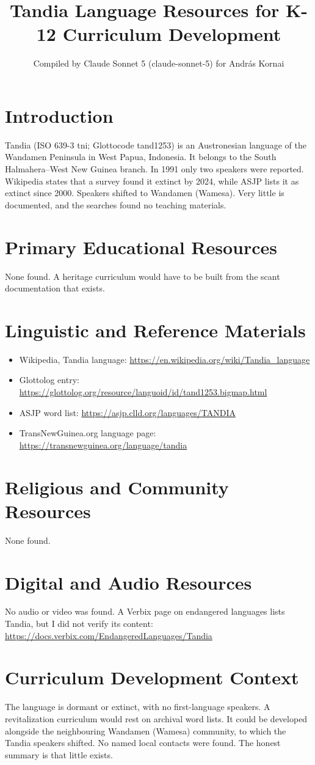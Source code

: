 \documentclass[12pt]{article}
\title{Tandia Language Resources for K-12 Curriculum Development}
\author{Compiled by Claude Sonnet 5 (claude-sonnet-5) for Andr\'as Kornai}
\date{}
\begin{document}
\maketitle

\section{Introduction}
Tandia (ISO 639-3 tni; Glottocode tand1253) is an Austronesian language of the Wandamen Peninsula in West Papua, Indonesia. It belongs to the South Halmahera--West New Guinea branch. In 1991 only two speakers were reported. Wikipedia states that a survey found it extinct by 2024, while ASJP lists it as extinct since 2000. Speakers shifted to Wandamen (Wamesa). Very little is documented, and the searches found no teaching materials.

\section{Primary Educational Resources}
None found. A heritage curriculum would have to be built from the scant documentation that exists.

\section{Linguistic and Reference Materials}
\begin{itemize}
\item Wikipedia, Tandia language: \url{https://en.wikipedia.org/wiki/Tandia_language}
\item Glottolog entry: \url{https://glottolog.org/resource/languoid/id/tand1253.bigmap.html}
\item ASJP word list: \url{https://asjp.clld.org/languages/TANDIA}
\item TransNewGuinea.org language page: \url{https://transnewguinea.org/language/tandia}
\end{itemize}

\section{Religious and Community Resources}
None found.

\section{Digital and Audio Resources}
No audio or video was found. A Verbix page on endangered languages lists Tandia, but I did not verify its content: \url{https://docs.verbix.com/EndangeredLanguages/Tandia}

\section{Curriculum Development Context}
The language is dormant or extinct, with no first-language speakers. A revitalization curriculum would rest on archival word lists. It could be developed alongside the neighbouring Wandamen (Wamesa) community, to which the Tandia speakers shifted. No named local contacts were found. The honest summary is that little exists.
\end{document}
